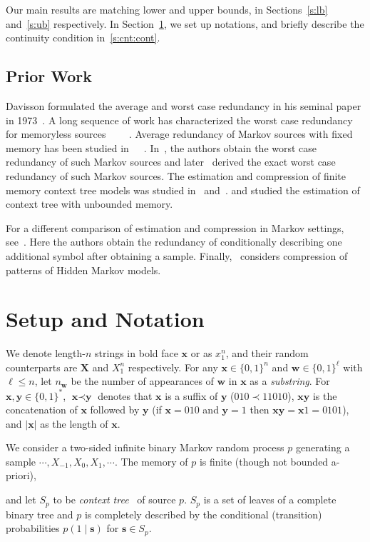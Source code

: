 \documentclass[conference,a4paper]{article}
\newcommand{\x}{\textbf{x}}
\newcommand{\y}{\textbf{y}}
\newcommand{\w}{\textbf{w}}
\newcommand{\s}{\textbf{s}}
\begin{document}
Our main results are matching lower and upper bounds, in Sections~\ref{s:lb}
and~\ref{s:ub} respectively. In Section~\ref{s:setup}, we set up notations,
and briefly describe the continuity condition in~\ref{s:cnt:cont}.


\subsection{Prior Work}
Davisson formulated the average and worst case redundancy in his
seminal paper in 1973~\cite{dav73}.  A long sequence of work has
characterized the worst case redundancy for memoryless sources
~\cite{kt81}~\cite{STW95}~\cite{xb97}~\cite{szp98}.  Average
redundancy of Markov sources with fixed memory has been studied
in~\cite{trofimov197}~\cite{davisson1983minimax}~\cite{atteson1999asymptotic}.
In~\cite{ris96}, the authors obtain the worst case redundancy of such
Markov sources and later~\cite{jacquet2004markov} derived the exact
worst case redundancy of such Markov sources. The estimation and
compression of finite memory context tree models was studied
in~\cite{willems1995context} and~\cite{rissanen1983universal}. \cite{csiszar2006context} and \cite{willems1998context} studied the estimation of context
tree with unbounded memory.

For a different comparison of estimation and compression in Markov
settings, see~\cite{falahatgar2016learning}. Here the authors obtain
the redundancy of conditionally describing one additional symbol after
obtaining a sample.  Finally,~\cite{dhulipala2006universal} considers
compression of patterns of Hidden Markov models.

\newcommand{\X}{{\mathbf X}}
\section{Setup and Notation}
\label{s:setup}
We denote length-$n$ strings in bold face $\x$ or as $x_1^n$, 
and their random counterparts are $\X$ and $X_1^n$ respectively.
For any $\x\in\{0,1\}^n$ and $\w\in\{0,1\}^{\ell}$ with $\ell\le n$,
let $n_{\w}$ be the number of appearances of $\w$ in $\x$ as a
\emph{substring}. For $\x,\y\in \{0,1\}^*$, $\x\prec \y$ denotes that
$\x$ is a suffix of $\y$ (\eg $010\prec 11010$),
$\x\y$ is the concatenation of $\x$ followed by $\y$ (\eg if $\x=010$
and $\y=1$ then $\x\y=\x1=0101$), and $|\x|$ as the length of $\x$.


We consider a two-sided infinite binary Markov random process $p$
generating a sample $\cdots,X_{-1}, X_0,X_1,\cdots$. The memory of $p$
is finite (though not bounded a-priori),  and let $S_p$ to be \emph{context tree}~\cite{STW95} of source $p$. $S_p$ is a set of leaves of a complete binary tree and $p$ is completely described by the conditional (transition) probabilities $p(1\mid \s)$ for $\s\in S_p$. 
\end{document}
